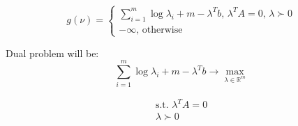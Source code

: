 \begin{equation*}
    g (\nu) = \begin{cases}
        \sum\limits_{i=1}^m \log \lambda_i + m - \lambda^Tb \text{, } \lambda^TA = 0\text{, } \lambda \succ 0 \\
        -\infty \text{, otherwise}
    \end{cases}
\end{equation*}

Dual problem will be:
\begin{equation*}
 \sum\limits_{i=1}^m \log \lambda_i + m -\lambda^T b \rightarrow \max_{\lambda \in \mathds{R}^m}
\end{equation*}

\begin{equation*}
    \begin{gathered}
    \text{s.t. } \lambda^TA = 0 \\
    \lambda \succ 0
    \end{gathered}
\end{equation*}